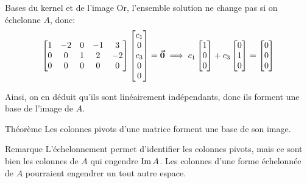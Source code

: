 \documentclass[a4paper]{article}
\begin{document}
\begin{parag}{Bases du kernel et de l'image}
    Or, l'ensemble solution ne change pas si on échelonne $A$, donc:
    \[\begin{bmatrix} 1 & -2 & 0 & -1 & 3 \\ 0 & 0 & 1 & 2 & -2 \\ 0 & 0 & 0 & 0 & 0 \end{bmatrix} \begin{bmatrix} c_1 \\ 0 \\ c_3 \\ 0 \\ 0 \end{bmatrix} = \bm{\protect\vec{0}} \implies c_1 \begin{bmatrix} 1 \\ 0 \\ 0 \end{bmatrix} + c_3 \begin{bmatrix} 0 \\ 1 \\ 0 \end{bmatrix} = \begin{bmatrix} 0 \\ 0 \\ 0 \end{bmatrix} \]

    Ainsi, on en déduit qu'ils sont linéairement indépendants, donc ils forment une base de l'image de $A$.
\end{parag}

\begin{parag}{Théorème}
    Les colonnes pivots d'une matrice forment une base de son image.

    \begin{subparag}{Remarque}
        L'échelonnement permet d'identifier les colonnes pivots, mais ce sont bien les colonnes de $A$ qui engendre $\operatorname{Im} A$. Les colonnes d'une forme échelonnée de $A$ pourraient engendrer un tout autre espace.
    \end{subparag}
\end{parag}
\end{document}
